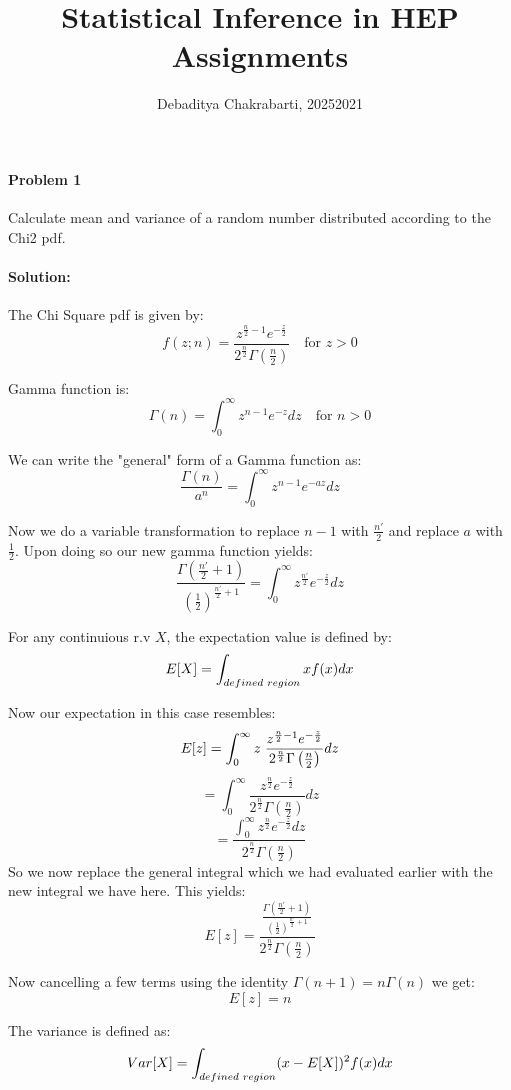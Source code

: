 \documentclass[12pt, letterpaper]{article}
\title{Statistical Inference in HEP Assignments}
\author{Debaditya Chakrabarti, 20252021}
\begin{document}
\maketitle
\paragraph{Problem 1}
 Calculate mean and variance of a random number distributed according to the Chi2 pdf. 
\paragraph{Solution:}
The Chi Square pdf is given by:
\[ f(z; n) = \frac{z^{\frac{n}{2}-1} e^{-\frac{z}{2}}}{2^{\frac{n}{2}} \Gamma\left(\frac{n}{2}\right)} \quad \text{for } z > 0 \]

Gamma function is:
\[ \Gamma(n) = \int_0^\infty z^{n-1} e^{-z} dz \quad \text{for } n > 0 \]

We can write the "general" form of a Gamma function as:
\[ \frac{\Gamma(n)}{a^{n}} = \int_0^\infty z^{n-1} e^{-az} dz \]

Now we do a variable transformation to replace $n-1$ with $\frac{n'}{2}$ and replace $a$ with $\frac{1}{2}$. Upon doing so our new gamma function yields:
\[ \frac{\Gamma(\frac{n'}{2}+1)}{\left(\frac{1}{2}\right)^{\frac{n'}{2}+1}} = \int_0^\infty z^{\frac{n'}{2}} e^{-\frac{z}{2}} dz \]

For any continuious r.v $X$, the expectation value is defined by:
\[ E[X] = \int_{defined \hspace{1mm} region}^{} x f(x) dx \]

Now our expectation in this case resembles:
\[ E[z] = \int_{0}^{\infty} z \hspace{1mm} \frac{z^{\frac{n}{2}-1} e^{-\frac{z}{2}}}{2^{\frac{n}{2}} \Gamma\left(\frac{n}{2}\right)} dz \]
\[   = \int_{0}^{\infty} \frac{z^{\frac{n}{2}} e^{-\frac{z}{2}}}{2^{\frac{n}{2}} \Gamma\left(\frac{n}{2}\right)} dz \]
\[   = \frac{\int_{0}^{\infty} z^{\frac{n}{2}} e^{-\frac{z}{2}} dz }{{2^{\frac{n}{2}} \Gamma\left(\frac{n}{2}\right)}} \]
So we now replace the general integral which we had evaluated earlier with the new integral we have here. This yields:
\[ E[z]  = \frac{\frac{\Gamma(\frac{n'}{2}+1)}{\left(\frac{1}{2}\right)^{\frac{n'}{2}+1}}}{{2^{\frac{n}{2}} \Gamma\left(\frac{n}{2}\right)}} \]

Now cancelling a few terms using the identity $\Gamma(n+1) = n \Gamma(n)$ we get:
\[ E[z]=n\]

The variance is defined as:
\[ Var[X]=\int_{defined \hspace{1mm} region}^{} (x - E[X])^2 f(x) dx \]
\end{document}
